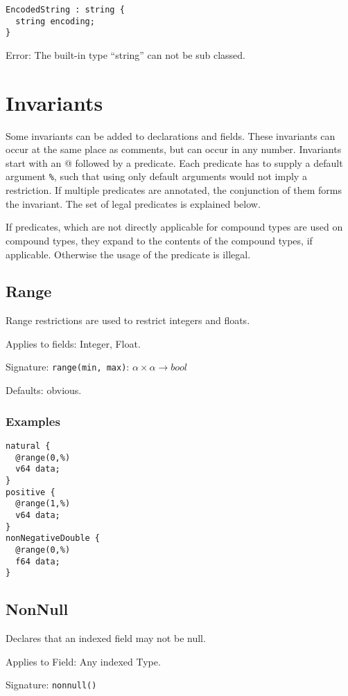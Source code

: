 \documentclass[a4paper,10pt]{article}
\begin{document}
\begin{verbatim}
EncodedString : string {
  string encoding;
}
\end{verbatim}
Error: The built-in type ``string'' can not be sub classed.

\section{Invariants}
Some invariants can be added to declarations and fields. These invariants can occur at the same place as comments, but can occur in any number. Invariants start with an \textsc{@} followed by a predicate. Each predicate has to supply a default argument \texttt{\%}, such that using only default arguments would not imply a restriction.
If multiple predicates are annotated, the conjunction of them forms the invariant.
The set of legal predicates is explained below.

If predicates, which are not directly applicable for compound types are used on compound types, they expand to the contents of the compound types, if applicable. Otherwise the usage of the predicate is illegal.

\subsection*{Range}
Range restrictions are used to restrict integers and floats.

Applies to fields: Integer, Float.

Signature: \verb/range(min, max)/: $\alpha \times \alpha → bool$

Defaults: obvious.

\subsubsection*{Examples}
\begin{verbatim}
natural {
  @range(0,%)
  v64 data;
}
positive {
  @range(1,%)
  v64 data;
}
nonNegativeDouble {
  @range(0,%)
  f64 data;
}
\end{verbatim}

\subsection*{NonNull}
Declares that an indexed field may not be null.

Applies to Field: Any indexed Type.

Signature: \verb/nonnull()/
\end{document}
